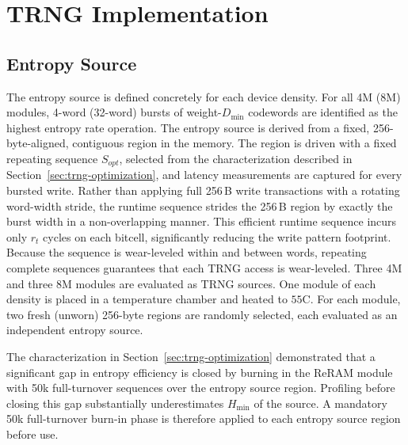 \section{TRNG Implementation}
\label{sec:trng-implementation}

\subsection{Entropy Source}
The entropy source is defined concretely for each device density. For
all 4M (8M) modules, 4-word (32-word) bursts of weight-$D_{\min}$
codewords are identified as the highest entropy rate operation. The
entropy source is derived from a fixed, 256-byte-aligned, contiguous
region in the memory. The region is driven with a fixed repeating
sequence $S_{opt}$, selected from the characterization described in
Section~\ref{sec:trng-optimization}, and latency measurements are
captured for every bursted write. Rather than applying full 256\,B write
transactions with a rotating word-width stride, the runtime sequence
strides the 256\,B region by exactly the burst width in a
non-overlapping manner. This efficient runtime sequence incurs only
$r_t$ cycles on each bitcell, significantly reducing the write pattern
footprint. Because the sequence is wear-leveled within and between
words, repeating complete sequences guarantees that each TRNG access is
wear-leveled. Three 4M and three 8M modules are evaluated as TRNG
sources. One module of each density is placed in a temperature chamber
and heated to $55$\textdegree C. For each module, two fresh (unworn)
256-byte regions are randomly selected, each evaluated as an independent
entropy source.



The characterization in Section~\ref{sec:trng-optimization} demonstrated
that a significant gap in entropy efficiency is closed by burning in the
ReRAM module with 50k full-turnover sequences over the entropy source
region. Profiling before closing this gap substantially underestimates
$H_{\min}$ of the source. A mandatory 50k full-turnover burn-in phase is
therefore applied to each entropy source region before use.

